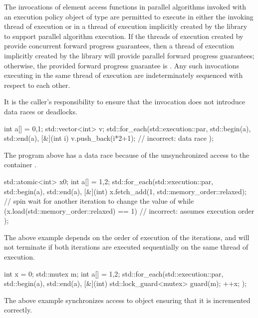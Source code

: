 \pnum
The invocations of element access functions in parallel algorithms invoked with
an execution policy object of type 
are permitted to execute
in either the invoking thread of execution or
in a thread of execution implicitly created by the library
to support parallel algorithm execution.
If the threads of execution created by 
provide concurrent forward progress guarantees,
then a thread of execution implicitly created by the library will provide
parallel forward progress guarantees;
otherwise, the provided forward progress guarantee is
.
Any such invocations executing in the same thread of execution
are indeterminately sequenced with respect to each other.
\begin{note}
It is the caller's responsibility to ensure
that the invocation does not introduce data races or deadlocks.
\end{note}
\begin{example}
\begin{codeblock}
int a[] = {0,1};
std::vector<int> v;
std::for_each(std::execution::par, std::begin(a), std::end(a), [&](int i) {
  v.push_back(i*2+1);                                 // incorrect: data race
});
\end{codeblock}
The program above has a data race because of the unsynchronized access to the
container .
\end{example}
\begin{example}
\begin{codeblock}
std::atomic<int> x{0};
int a[] = {1,2};
std::for_each(std::execution::par, std::begin(a), std::end(a), [&](int) {
  x.fetch_add(1, std::memory_order::relaxed);
  // spin wait for another iteration to change the value of 
  while (x.load(std::memory_order::relaxed) == 1) { } // incorrect: assumes execution order
});
\end{codeblock}
The above example depends on the order of execution of the iterations, and
will not terminate if both iterations are executed sequentially
on the same thread of execution.
\end{example}
\begin{example}
\begin{codeblock}
int x = 0;
std::mutex m;
int a[] = {1,2};
std::for_each(std::execution::par, std::begin(a), std::end(a), [&](int) {
  std::lock_guard<mutex> guard(m);
  ++x;
});
\end{codeblock}
The above example synchronizes access to object 
ensuring that it is incremented correctly.
\end{example}

